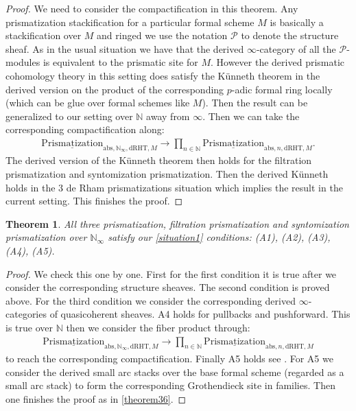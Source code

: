 \documentclass[12pt]{article}
\newtheorem{theorem}{Theorem}
\theoremstyle{definition}
\begin{document}
\begin{proof}
We need to consider the compactification in this theorem. Any prismatization  stackification for a particular formal scheme $M$ is basically a stackification over $M$ and ringed we use the notation $\mathcal{P}$ to denote the structure sheaf. As in the usual situation we have that the derived $\infty$-category of all the $\mathcal{P}$-modules is equivalent to the prismatic site for $M$. However the derived prismatic cohomology theory in this setting does satisfy the K\"unneth theorem in the derived version on the product of the corresponding $p$-adic formal ring locally (which can be glue over formal schemes like $M$). Then the result can be generalized to our setting over $\mathbb{N}$ away from $\infty$. Then we can take the corresponding compactification along:
\begin{align}
{\underline{\mathrm{Prismatization}}}_{\mathrm{abs},\mathbb{N}_\infty,\mathrm{dRHT},M}\rightarrow  \prod_{n\in \mathbb{N}} {\underline{\mathrm{Prismatization}}}_{\mathrm{abs},n,\mathrm{dRHT},M}.
\end{align}
The derived version of the K\"unneth theorem then holds for the filtration  prismatization and syntomization prismatization. Then the derived K\"unneth holds in the 3 de Rham prismatizations situation which implies the result in the current setting. This finishes the proof.
\end{proof}

\begin{theorem}
All three prismatization, filtration prismatization and syntomization prismatization over $\mathbb{N}_\infty$ satisfy our \cref{situation1} conditions: (A1), (A2), (A3), (A4), (A5). 
\end{theorem}


\begin{proof}
We check this one by one. First for the first condition it is true after we consider the corresponding structure sheaves. The second condition is proved above. For the third condition we consider the corresponding derived $\infty$-categories of quasicoherent sheaves. A4 holds for pullbacks and pushforward. This is true over $\mathbb{N}$ then we consider the fiber product through:
\begin{align}
{\underline{\mathrm{Prismatization}}}_{\mathrm{abs},\mathbb{N}_\infty,\mathrm{dRHT},M}\rightarrow  \prod_{n\in \mathbb{N}} {\underline{\mathrm{Prismatization}}}_{\mathrm{abs},n,\mathrm{dRHT},M}
\end{align}
to reach the corresponding compactification. Finally A5 holds see \cite[Chapter 4, in particular 4.7, 4.8, 4.9, 4.10]{3A}. For A5 we consider the derived small arc stacks over the base formal scheme (regarded as a small arc stack) to form the corresponding Grothendieck site in families. Then one finishes the proof as in \cref{theorem36}.
\end{proof}
\end{document}
